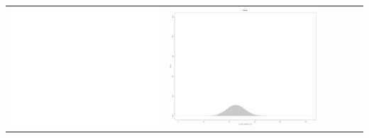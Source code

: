 \begin{table}[htbp]
{\begin{tabular}{l | ccccc}
\begin{minipage}{.15\textwidth}
     			 	\includegraphics[width=\linewidth]{images/mema-dens-graph/N5}
    				 \end{minipage}
    			   &	 \begin{minipage}{.15\textwidth}\vspace{2pt}     							
     			 	\includegraphics[width=\linewidth]{images/mema-dens-graph/N9}
    				 \end{minipage}
    			   &	 \begin{minipage}{.15\textwidth}\vspace{2pt}     							

\end{minipage}
\end{tabular}}
\end{table}

